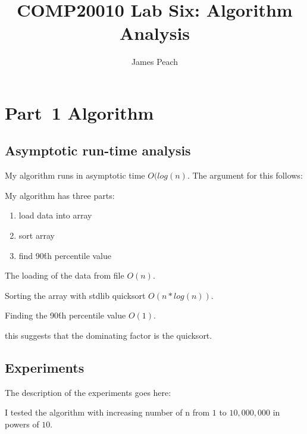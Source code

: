 \documentclass{article}
\title{COMP20010 Lab Six: Algorithm Analysis}
\author{James Peach}
\begin{document}
\maketitle

\section{Part~1 Algorithm}
\label{sec:algorithm1}

\subsection{Asymptotic run-time analysis}

My algorithm runs in asymptotic time $O(log(n)$. The argument for this follows:

My algorithm has three parts:
\begin{enumerate}
	\item load data into array
	\item sort array
	\item find 90\'th percentile value
\end{enumerate}

The loading of the data from file $O(n)$.

Sorting the array with stdlib quicksort $O(n*log(n))$.

Finding the 90\'th percentile value $O(1)$.

this suggests that the dominating factor is the quicksort.

\subsection{Experiments}
\label{sec:experiments1}
The description of the experiments goes here: 

I tested the algorithm with increasing number of n from $1$ to $10,000,000$ 
in powers of $10$.

\end{document}
